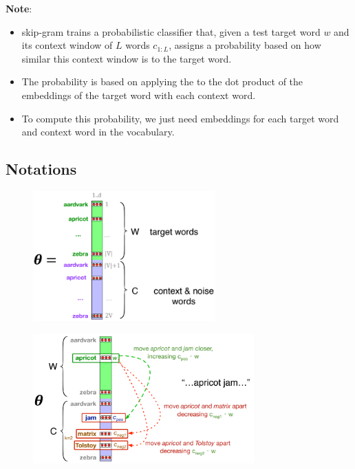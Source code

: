 \vspace{0.2cm}
\noindent\textbf{Note}:
\begin{itemize}
    \item skip-gram trains a probabilistic classifier that, given a test target word $w$ and its context window of $L$ words $c_{1:L}$, assigns a probability based on how similar this context window is to the target word.

    \item The probability is based on applying the  to the dot product of the embeddings of the target word with each context word. 
    
    \item To compute this probability, we just need embeddings for each target word and context word in the vocabulary.
\end{itemize}


\subsection*{Notations}
\begin{table}[h]
    \begin{minipage}{0.44\linewidth}
        \begin{figure}[H]
            \centering
            \includegraphics[width=\linewidth, height=5cm, keepaspectratio]{Pictures/info-retrieval/skip-gram-6-13.png}
        \end{figure}
    \end{minipage}
    \hfill
    \vrule
    \hfill
    \begin{minipage}{0.55\linewidth}
        \begin{figure}[H]
            \includegraphics[width=\linewidth, height=5cm, keepaspectratio]{Pictures/info-retrieval/skip-gram-6-14.png}
        \end{figure}
    \end{minipage}
\end{table}

